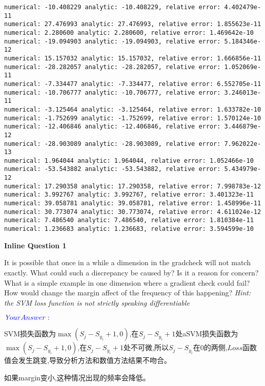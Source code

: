 \documentclass[11pt]{article}
\begin{document}
    \begin{Verbatim}[commandchars=\\\{\}]
numerical: -10.408229 analytic: -10.408229, relative error: 4.402479e-11
numerical: 27.476993 analytic: 27.476993, relative error: 1.855623e-11
numerical: 2.280600 analytic: 2.280600, relative error: 1.469642e-10
numerical: -19.094903 analytic: -19.094903, relative error: 5.184346e-12
numerical: 15.157032 analytic: 15.157032, relative error: 1.666856e-11
numerical: -28.282057 analytic: -28.282057, relative error: 1.052069e-11
numerical: -7.334477 analytic: -7.334477, relative error: 6.552705e-11
numerical: -10.706777 analytic: -10.706777, relative error: 3.246013e-11
numerical: -3.125464 analytic: -3.125464, relative error: 1.633782e-10
numerical: -1.752699 analytic: -1.752699, relative error: 1.570124e-10
numerical: -12.406846 analytic: -12.406846, relative error: 3.446879e-12
numerical: -28.903089 analytic: -28.903089, relative error: 7.962022e-13
numerical: 1.964044 analytic: 1.964044, relative error: 1.052466e-10
numerical: -53.543882 analytic: -53.543882, relative error: 5.434979e-12
numerical: 17.290358 analytic: 17.290358, relative error: 7.998783e-12
numerical: 3.992767 analytic: 3.992767, relative error: 3.401323e-11
numerical: 39.058781 analytic: 39.058781, relative error: 1.458996e-11
numerical: 30.773074 analytic: 30.773074, relative error: 4.611024e-12
numerical: 7.486540 analytic: 7.486540, relative error: 1.810384e-11
numerical: 1.236683 analytic: 1.236683, relative error: 3.594599e-10
    \end{Verbatim}

    \textbf{Inline Question 1}

It is possible that once in a while a dimension in the gradcheck will
not match exactly. What could such a discrepancy be caused by? Is it a
reason for concern? What is a simple example in one dimension where a
gradient check could fail? How would change the margin affect of the
frequency of this happening? \emph{Hint: the SVM loss function is not
strictly speaking differentiable}

\(\color{blue}{\textit Your Answer:}\)

SVM损失函数为\(\max(S_j-S_{y_i}+1,0)\),在\(S_j-S_{y_i}+1\)处aSVM损失函数为\(\max(S_j-S_{y_i}+1,0)\),在\(S_j-S_{y_i}+1\)处不可微,所以\(S_j-S_{y_i}\)在0的两侧,\(Loss\)函数值会发生跳变,导致分析方法和数值方法结果不吻合。

如果margin变小,这种情况出现的频率会降低。
\end{document}
